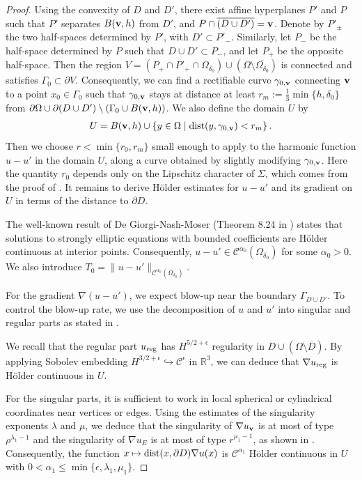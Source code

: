 ﻿\documentclass[11pt,reqno,oneside]{amsart}
\theoremstyle{definition}
\theoremstyle{remark}
\newcommand{\setdef}[2]{\left\lbrace {#1} \; \middle| \; {#2} \right\rbrace}
\newcommand{\R}{\mathbb{R}}
\newcommand{\Cont}{\mathcal{C}}
\newcommand{\n}{\nabla}
\newcommand{\dist}{{\rm dist}}
\renewcommand{\a}{\alpha}
\renewcommand{\d}{\delta}
\newcommand{\g}{\gamma}
\newcommand{\lm}{\lambda}
\newcommand{\p}{\partial}
\renewcommand{\O}{\Omega}
\begin{document}
    \begin{proof}
        Using the convexity of $D$ and $D'$, there exist affine hyperplanes $P'$ and $P$ such that $P'$ separates $B({\bf v},h)$ from $D'$, and $P\cap \overline{(D\cup D')}={\bf v}$. Denote by $P'_\pm$ the two half-spaces determined by $P'$, with $D'\subset P'_-$. Similarly, let $P_-$ be the half-space determined by $P$ such that $D\cup D'\subset P_-$, and let $P_+$ be the opposite half-space. Then the region $V=(P_+\cap P'_+ \cap \O_{\d_0})\cup (\O\setminus \overline{\O_{\d_0}})$ is connected and satisfies $\Gamma_0\subset \p V$. Consequently, we can find a rectifiable curve $\g_{0,{\bf v}}$ connecting $\bf v$ to a point $x_0\in \Gamma_0$ such that $\g_{0,{\bf v}}$ stays at distance at least $r_m:=\frac{1}{3}\min\{h,\d_0\}$ from $\p\O\cup \p (D\cup D')\setminus (\Gamma_0 \cup B({\bf v},h))$. We also define the domain $U$ by
        \begin{align*}
            U=B({\bf v},h)\cup \setdef{y\in\O}{\dist(y,\g_{0, {\bf v}})<r_m}.
        \end{align*}        
        Then we choose $r<\min\{r_0,r_m\}$ small enough to apply  to the harmonic function $u-u'$ in the domain $U$, along a curve obtained by slightly modifying $\g_{0,{\bf v}}$. Here the quantity $r_0$ depends only on the Lipschitz character of $\Sigma$, which comes from the proof of . It remains to derive H\"older estimates for $u-u'$ and its gradient on $U$ in terms of the distance to $\p D$.

        The well-known result of De Giorgi-Nash-Moser (Theorem 8.24 in \cite{Gilbarg-Trudinger}) states that solutions to strongly elliptic equations with bounded coefficients are H\"older continuous at interior points. Consequently, $u-u'\in\Cont^{\a_0}(\O_{\d_0})$ for some $\a_0>0$. We also introduce $T_0=\|u-u'\|_{\Cont^{\a_0}(\O_{\d_0})}$.
        
        For the gradient $\n (u-u')$, we expect blow-up near the boundary $\Gamma_{D\cup D'}$. To control the blow-up rate, we use the decomposition of $u$ and $u'$ into singular and regular parts as stated in .
        
        We recall that the regular part $u_{\rm reg}$ has $H^{5/2+\epsilon}$ regularity in $D\cup (\O\setminus \overline{D})$. By applying Sobolev embedding $H^{3/2+\epsilon}\hookrightarrow \Cont^{\epsilon}$ in $\R^3$, we can deduce that $\n u_{\rm reg}$ is H\"older continuous in $U$. 
        
        For the singular parts, it is sufficient to work in local spherical or cylindrical coordinates near vertices or edges. Using the estimates of the singularity exponents $\lm$ and $\mu$, we deduce that the singularity of $\n u_{\bf v}$ is at most of type $\rho^{\lm_1-1}$ and the singularity of $\n u_E$ is at most of type $r^{\mu_1-1}$, as shown in . Consequently, the function $x\mapsto \dist(x,\p D)\n u(x)$ is $\Cont^{\a_1}$ H\"older continuous in $U$ with $0<\a_1\leq \min\{\epsilon,\lm_1, \mu_1\}$.
        

\end{proof}
\end{document}
